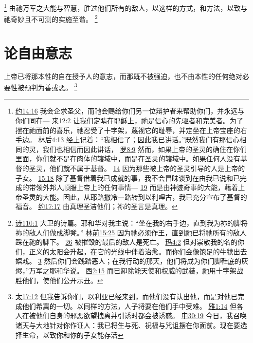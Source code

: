 \documentclass[12pt, a4paper, oneside]{ctexart}
\newcounter{parnum}[section]
\newcommand{\N}{%
   \noindent\refstepcounter{parnum}%
    \makebox[\parindent][l]{\textbf{\arabic{parnum}.}}}
\begin{document}
	\footnote {
		\href{https://biblehub.com/john/14-16.htm}{约14:16} 我会企求圣父，而祂会赐给你们另一位辩护者来帮助你们，并永远与你们同在---
		\href{https://biblehub.com/hebrews/12-2.htm}{来12:2} 让我们定睛在耶稣上，祂是信心的先驱者和完美者。为了摆在祂面前的喜乐，祂忍受了十字架，蔑视它的耻辱，并定坐在上帝宝座的右手边。
		\href{https://biblehub.com/2_corinthians/4-13.htm}{林后4:13} 经上记着：“我相信了；因此我已讲话。”既然我们有那信心相同的灵，我们也相信而因此讲话，
		\href{https://biblehub.com/romans/8-9.htm}{罗8:9} 然而，如果上帝的圣灵的确住在你们里面，你们就不是在肉体的辖域中，而是在圣灵的辖域中。如果任何人没有基督的圣灵，他们就不属于基督。
		\href{https://biblehub.com/romans/8-14.htm}{14} 因为那些被上帝的圣灵引导的人是上帝的子女。
		\href{https://biblehub.com/romans/15-18.htm}{15:18} 除了基督借着我已成就的事，我不会冒昧谈到在由我已说和已完成的带领外邦人顺服上帝上的任何事情---
		\href{https://biblehub.com/romans/15-19.htm}{19} 而是由神迹奇事的大能，藉着上帝圣灵的大能。因此，从耶路撒冷一路转到以利哩古，我已充分宣布了基督的福音。
		\href{https://biblehub.com/john/17-17.htm}{约17:17} 由真理圣洁他们；祢的圣言是真理。
	}
	由祂万军之大能与智慧，胜过他们所有的敌人，以这样的方式，和方法，以致与祂奇妙且不可测的实施至谐。
	\footnote {
		\href{https://biblehub.com/psalms/110-1.htm}{诗110:1} 大卫的诗篇。耶和华对我主说：“坐在我的右手边，直到我为祢的脚将祢的敌人们做成脚凳。”
		\href{https://biblehub.com/1_corinthians/15-25.htm}{林前15:25} 因为祂必须作王，直到祂已将祂所有的敌人踩在祂的脚下。
		\href{https://biblehub.com/1_corinthians/15-26.htm}{26} 被摧毁的最后的敌人是死亡。
		\href{https://biblehub.com/malachi/4-2.htm}{玛4:2} 但对崇敬我的名的你们，正义的太阳会升起，在它的光线中伴着治愈。而你们会像饱足的牛犊出去嬉戏。
		\href{https://biblehub.com/malachi/4-3.htm}{3} 然后你们会践踏恶人；在我行动的那天，他们将成为你们脚鞋底的灰烬，”万军之耶和华说。
		\href{https://biblehub.com/colossians/2-15.htm}{西2:15} 而已卸除能天使和权威的武装，祂用十字架战胜他们，使他们公开示丑。
	}

\section{论自由意志}

\N 上帝已将那本性的自在授予人的意志，而那既不被强迫，也不由本性的任何绝对必要性被预判为善或恶。
	\footnote {
		\href{https://biblehub.com/matthew/17-12.htm}{太17:12} 但我告诉你们，以利亚已经来到，而他们没有认出他，而是对他已完成他们希冀的一切。以同样的方法，人子将要在他们手中受难。
		\href{https://biblehub.com/james/1-14.htm}{雅1:14} 但各人在被他们自身的邪恶欲望拽离并引诱时都会被诱惑。
		\href{https://biblehub.com/deuteronomy/30-19.htm}{申30:19} 今日，我召唤诸天与大地针对你作证人：我已将生与死、祝福与咒诅摆在你面前。现在要选择生命，以致你和你的子女能存活
	}
\end{document}
